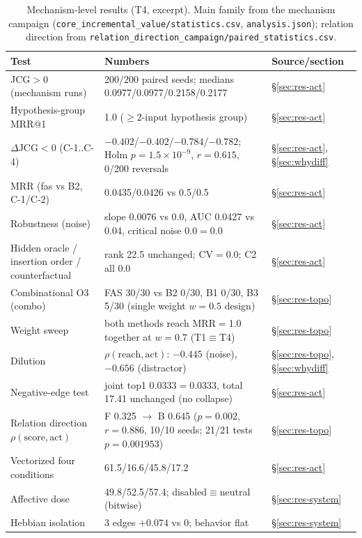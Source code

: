 \documentclass[10pt,a4paper]{article}
\begin{document}
\begin{table}[t]
\centering\small
\caption{Mechanism-level results (T4, excerpt). Main family from the mechanism campaign (\texttt{core\_incremental\_value/statistics.csv}, \texttt{analysis.json}); relation direction from \texttt{relation\_direction\_campaign/paired\_statistics.csv}.}
\label{tab:mechanism}
\begin{tabular}{L{4.6cm}L{5.6cm}L{4.2cm}}
\toprule
\textbf{Test} & \textbf{Numbers} & \textbf{Source/section} \\
\midrule
JCG$>$0 (mechanism runs) & 200/200 paired seeds; medians 0.0977/0.0977/0.2158/0.2177 & \S\ref{sec:res-act} \\
Hypothesis-group MRR@1 & 1.0 ($\ge$2-input hypothesis group) & \S\ref{sec:res-act} \\
$\Delta$JCG$<$0 (C-1..C-4) & ${-}0.402$/${-}0.402$/${-}0.784$/${-}0.782$; Holm $p{=}1.5\times10^{-9}$, $r{=}0.615$, 0/200 reversals & \S\ref{sec:res-act}, \S\ref{sec:whydiff} \\
MRR (fas vs B2, C-1/C-2) & 0.0435/0.0426 vs 0.5/0.5 & \S\ref{sec:res-act} \\
Robustness (noise) & slope 0.0076 vs 0.0, AUC 0.0427 vs 0.04, critical noise 0.0$=$0.0 & \S\ref{sec:res-act} \\
Hidden oracle / insertion order / counterfactual & rank 22.5 unchanged; CV$=$0.0; C2 all 0.0 & \S\ref{sec:res-act} \\
Combinational O3 (combo) & FAS 30/30 vs B2 0/30, B1 0/30, B3 5/30 (single weight $w{=}0.5$ design) & \S\ref{sec:res-topo} \\
Weight sweep & both methods reach MRR$=$1.0 together at $w{=}0.7$ (T1$\equiv$T4) & \S\ref{sec:res-topo} \\
Dilution & $\rho(\mathrm{reach},\mathrm{act})$: $-0.445$ (noise), $-0.656$ (distractor) & \S\ref{sec:res-topo}, \S\ref{sec:whydiff} \\
Negative-edge test & joint top1 0.0333$=$0.0333, total 17.41 unchanged (no collapse) & \S\ref{sec:res-act} \\
Relation direction $\rho(\mathrm{score},\mathrm{act})$ & F 0.325 $\rightarrow$ B 0.645 ($p{=}0.002$, $r{=}0.886$, 10/10 seeds; 21/21 tests $p{=}0.001953$) & \S\ref{sec:res-topo} \\
Vectorized four conditions & 61.5/16.6/45.8/17.2 & \S\ref{sec:res-act} \\
Affective dose & 49.8/52.5/57.4; disabled$\equiv$neutral (bitwise) & \S\ref{sec:res-system} \\
Hebbian isolation & 3 edges $+0.074$ vs 0; behavior flat & \S\ref{sec:res-system} \\
\bottomrule
\end{tabular}
\end{table}
\end{document}
